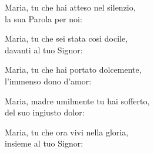 
\strofa Maria, tu che hai atteso nel silenzio,\\
la sua Parola per noi:

\spazio


\spazio

\strofa Maria, tu che sei stata così docile,\\
davanti al tuo Signor:

\spazio


\spazio

\strofa Maria, tu che hai portato dolcemente,\\
l'immenso dono d'amor:

\spazio


\spazio

\strofa Maria, madre umilmente tu hai sofferto,\\
del suo ingiusto dolor:

\spazio


\spazio

\strofa Maria, tu che ora vivi nella gloria,\\
insieme al tuo Signor:

\spazio

